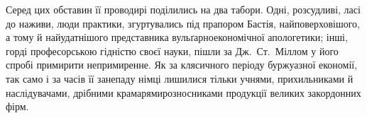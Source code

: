 \documentclass{kapital}
\begin{document}
   Серед цих обставин її проводирі поділились на два табори.
Одні, розсудливі, ласі до наживи, люди практики, згуртувались
під прапором Бастія, найповерховішого, а тому й найудатнішого
представника вульґарно\dash{}економічної апологетики; інші, горді
професорською гідністю своєї науки, пішли за Дж.~Ст.~Міллом у
його спробі примирити непримиренне. Як за клясичного періоду
буржуазної економії, так само і за часів її занепаду німці лишилися
тільки учнями, прихильниками й наслідувачами, дрібними
крамарями\dash{}розносниками продукції великих закордонних фірм.
  
\end{document}
